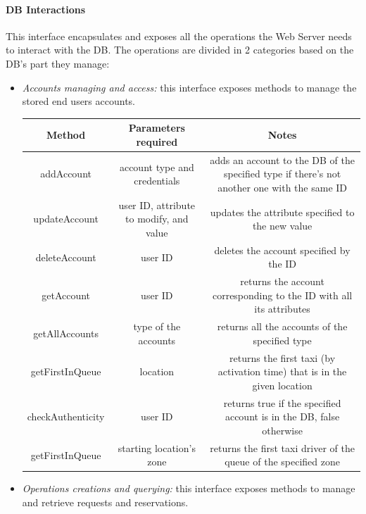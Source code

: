 \documentclass{article}
\begin{document}
\paragraph{DB Interactions}
This interface encapsulates and exposes all the operations the Web Server needs to interact with the DB\@. The operations are divided in 2 categories based on the DB's part they manage:
\begin{itemize}	
	\item \textit{Accounts managing and access:} this interface exposes methods to manage the stored end users accounts.\\	
	\begin{table}[H]
		\begin{adjustbox}{width=1.2\textwidth}
			\begin{tabular}{*{3}{c}}
				\toprule
				Method & Parameters required & Notes \\
				\midrule
				addAccount & account type and credentials & adds an account to the DB of the specified type if there's not another one with the same ID\\
				updateAccount & user ID, attribute to modify, and value & updates the attribute specified to the new value\\ 
				deleteAccount & user ID & deletes the account specified by the ID \\
				getAccount & user ID & returns the account corresponding to the ID with all its attributes \\
				getAllAccounts & type of the accounts & returns all the accounts of the specified type \\
				getFirstInQueue & location & returns the first taxi (by activation time) that is in the given location\\
				checkAuthenticity & user ID & returns true if the specified account is in the DB, false otherwise \\
				getFirstInQueue & starting location's zone & returns the first taxi driver of the queue of the specified zone \\
				\bottomrule
			\end{tabular}	
		\end{adjustbox}
	\end{table}
\item \textit{Operations creations and querying:} this interface exposes methods to manage and retrieve requests and reservations.\\	
	\begin{table}[H]
		\begin{adjustbox}{width=1.2\textwidth}

\end{adjustbox}
\end{table}
\end{itemize}
\end{document}
